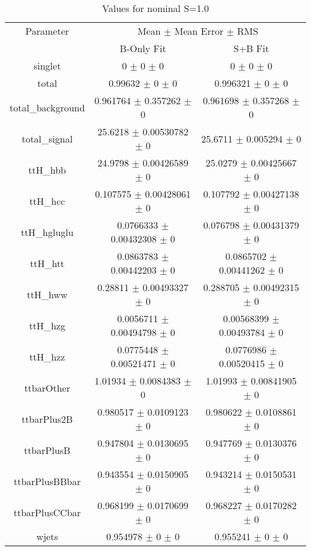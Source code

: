 \begin{table}
\centering
\caption{Values for nominal S=1.0}
\begin{tabular}{ccc}
\toprule
Parameter & \multicolumn{2}{c}{Mean $\pm$ Mean Error $\pm$ RMS}\\
 & B-Only Fit & S+B Fit\\
\midrule
singlet & \num{0} $\pm$ \num{0} $\pm$ \num{0} & \num{0} $\pm$ \num{0} $\pm$ \num{0}\\
total & \num{0.99632} $\pm$ \num{0} $\pm$ \num{0} & \num{0.996321} $\pm$ \num{0} $\pm$ \num{0}\\
total\_background & \num{0.961764} $\pm$ \num{0.357262} $\pm$ \num{0} & \num{0.961698} $\pm$ \num{0.357268} $\pm$ \num{0}\\
total\_signal & \num{25.6218} $\pm$ \num{0.00530782} $\pm$ \num{0} & \num{25.6711} $\pm$ \num{0.005294} $\pm$ \num{0}\\
ttH\_hbb & \num{24.9798} $\pm$ \num{0.00426589} $\pm$ \num{0} & \num{25.0279} $\pm$ \num{0.00425667} $\pm$ \num{0}\\
ttH\_hcc & \num{0.107575} $\pm$ \num{0.00428061} $\pm$ \num{0} & \num{0.107792} $\pm$ \num{0.00427138} $\pm$ \num{0}\\
ttH\_hgluglu & \num{0.0766333} $\pm$ \num{0.00432308} $\pm$ \num{0} & \num{0.076798} $\pm$ \num{0.00431379} $\pm$ \num{0}\\
ttH\_htt & \num{0.0863783} $\pm$ \num{0.00442203} $\pm$ \num{0} & \num{0.0865702} $\pm$ \num{0.00441262} $\pm$ \num{0}\\
ttH\_hww & \num{0.28811} $\pm$ \num{0.00493327} $\pm$ \num{0} & \num{0.288705} $\pm$ \num{0.00492315} $\pm$ \num{0}\\
ttH\_hzg & \num{0.0056711} $\pm$ \num{0.00494798} $\pm$ \num{0} & \num{0.00568399} $\pm$ \num{0.00493784} $\pm$ \num{0}\\
ttH\_hzz & \num{0.0775448} $\pm$ \num{0.00521471} $\pm$ \num{0} & \num{0.0776986} $\pm$ \num{0.00520415} $\pm$ \num{0}\\
ttbarOther & \num{1.01934} $\pm$ \num{0.0084383} $\pm$ \num{0} & \num{1.01993} $\pm$ \num{0.00841905} $\pm$ \num{0}\\
ttbarPlus2B & \num{0.980517} $\pm$ \num{0.0109123} $\pm$ \num{0} & \num{0.980622} $\pm$ \num{0.0108861} $\pm$ \num{0}\\
ttbarPlusB & \num{0.947804} $\pm$ \num{0.0130695} $\pm$ \num{0} & \num{0.947769} $\pm$ \num{0.0130376} $\pm$ \num{0}\\
ttbarPlusBBbar & \num{0.943554} $\pm$ \num{0.0150905} $\pm$ \num{0} & \num{0.943214} $\pm$ \num{0.0150531} $\pm$ \num{0}\\
ttbarPlusCCbar & \num{0.968199} $\pm$ \num{0.0170699} $\pm$ \num{0} & \num{0.968227} $\pm$ \num{0.0170282} $\pm$ \num{0}\\
wjets & \num{0.954978} $\pm$ \num{0} $\pm$ \num{0} & \num{0.955241} $\pm$ \num{0} $\pm$ \num{0}\\
\bottomrule
\end{tabular}
\end{table}